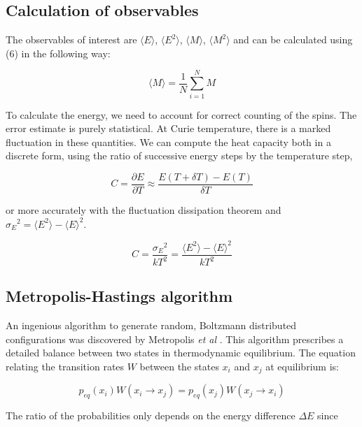 \documentclass[a4paper]{article}
\begin{document}
\subsection{Calculation of observables}

The observables of interest are $\langle E \rangle$, $\langle E^2 \rangle$, $\langle M \rangle $, $\langle M^2 \rangle$ and can be calculated using (6) in the following way:

\begin{equation}
\langle M \rangle = \frac{1}{N} \sum_{i=1}^{N} M
\end{equation}

To calculate the energy, we need to account for correct counting of the spins. The error estimate is purely statistical. At Curie temperature, there is a marked fluctuation in these quantities. We can compute the heat capacity both in a discrete form, using the ratio of successive energy steps by the temperature step,

\begin{equation}
C = \frac{\partial E}{\partial T} \approx \frac{E(T+ \delta T)- E(T)}{\delta T} 
\end{equation}

or more accurately with the fluctuation dissipation theorem and ${\sigma_E}^2 = \langle E^2 \rangle - {\langle E \rangle}^2 $. 

\begin{equation}
 C   = \frac{{\sigma_E}^2}{kT^2} = \frac{\langle E^2 \rangle - {\langle E \rangle}^2}{kT^2} 
\end{equation}


\subsection{Metropolis-Hastings algorithm}

An ingenious algorithm to generate random, Boltzmann distributed configurations was discovered by Metropolis \textit{et al} \cite{met}. This algorithm prescribes a detailed balance between two states in thermodynamic equilibrium. The equation relating the transition rates $W$ between the states $x_i$ and $x_j$ at equilibrium is:  

\begin{equation}
p_{eq}(x_i)W(x_i \rightarrow x_j) = p_{eq}(x_j)W(x_j \rightarrow x_i)
\end{equation}

The ratio of the probabilities only depends on the energy difference $\Delta E$ since
\end{document}
